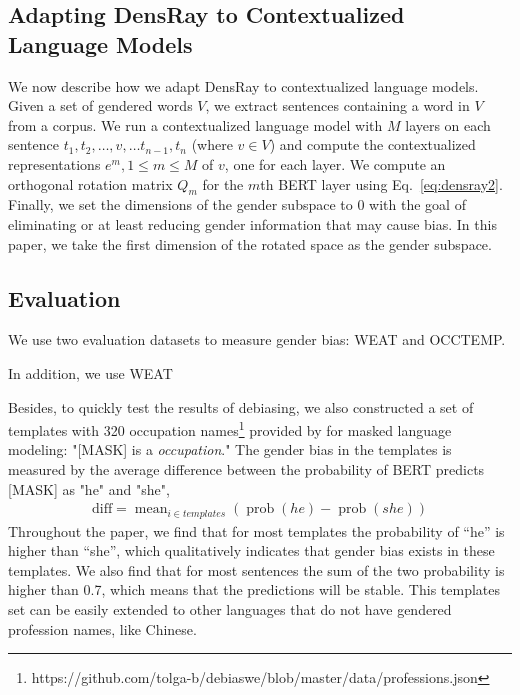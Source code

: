 \subsection{Adapting DensRay to Contextualized Language Models}
We now describe how we adapt DensRay to contextualized
language models. Given a set of gendered words
$V$, we extract sentences containing a word in $V$ from a
corpus. We run a contextualized language model
with $M$ layers
on each
sentence
$t_1,t_2,\ldots,v,\ldots t_{n-1},t_n$ (where $v \in V$)
and compute the contextualized representations $e^m, 1\leq m
\leq M$ of $v$, one for each layer. 
We compute an orthogonal rotation
matrix $Q_m$ for the $m$th BERT layer using Eq.\
\ref{eq:densray2}.
Finally, we set the dimensions
of the gender subspace to $0$ with the goal of eliminating
or at least reducing
gender
information that may cause bias. In this
paper, we take the first dimension of the rotated space as
the gender subspace.

\subsection{Evaluation}\label{sec:eval}
We use two evaluation datasets
to measure gender
bias: WEAT and OCCTEMP.


In addition, we use WEAT 

Besides, to quickly test the results of debiasing, we
also constructed a set of templates with 320 occupation
names\footnote{https://github.com/tolga-b/debiaswe/blob/master/data/professions.json}
provided by \citet{bolukbasi2016man} for masked language
modeling: "[MASK] is a \textit{occupation}." The gender bias
in the templates is measured by the average difference
between the probability of BERT predicts [MASK] as "he" and
"she",
\begin{eqnarray}
    \text{diff}=\mathop{mean}_{i \in templates}(\mathop{prob}(he)-\mathop{prob}(she))\nonumber
\end{eqnarray}
Throughout the paper, we find that for most templates the probability of ``he'' is higher than ``she'', which qualitatively indicates that gender bias exists in these templates. We also find that for most sentences the sum of the two probability is higher than 0.7, which means that the predictions will be stable. This templates set can be easily extended to other languages that do not have gendered profession names, like Chinese.
